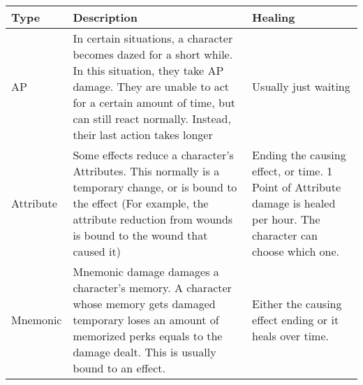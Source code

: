 \begin{longtable}{l p{5cm} p{5cm}}
Type & Description & Healing \\ \hline
AP & In certain situations, a character becomes dazed for a short while. In this situation, they take AP damage. They are unable to act for a certain amount of time, but can still react normally. Instead, their last action takes longer & Usually just waiting\\
Attribute & Some effects reduce a character's Attributes. This normally is a temporary change, or is bound to the effect (For example, the attribute reduction from wounds is bound to the wound that caused it) & Ending the causing effect, or time. 1 Point of Attribute damage is healed per hour. The character can choose which one.\\
Mnemonic & Mnemonic damage damages a character's memory. A character whose memory gets damaged temporary loses an amount of memorized perks equals to the damage dealt. This is usually bound to an effect. & Either the causing effect ending or it heals over time.\\
\end{longtable}
